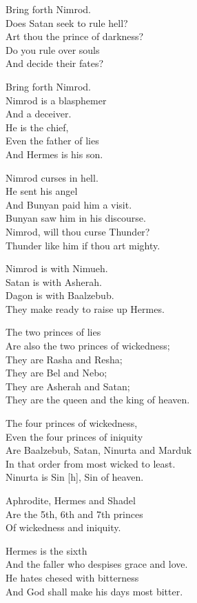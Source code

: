 \documentclass[
]{book}
\begin{document}
Bring forth Nimrod.\\
Does Satan seek to rule hell?\\
Art thou the prince of darkness?\\
Do you rule over souls\\
And decide their fates?

Bring forth Nimrod.\\
Nimrod is a blasphemer\\
And a deceiver.\\
He is the chief,\\
Even the father of lies\\
And Hermes is his son.

Nimrod curses in hell.\\
He sent his angel\\
And Bunyan paid him a visit.\\
Bunyan saw him in his discourse.\\
Nimrod, will thou curse Thunder?\\
Thunder like him if thou art mighty.

Nimrod is with Nimueh.\\
Satan is with Asherah.\\
Dagon is with Baalzebub.\\
They make ready to raise up Hermes.

The two princes of lies\\
Are also the two princes of wickedness;\\
They are Rasha and Resha;\\
They are Bel and Nebo;\\
They are Asherah and Satan;\\
They are the queen and the king of heaven.

The four princes of wickedness,\\
Even the four princes of iniquity\\
Are Baalzebub, Satan, Ninurta and Marduk\\
In that order from most wicked to least.\\
Ninurta is Sin {[}h{]}, Sin of heaven.

Aphrodite, Hermes and Shadel\\
Are the 5th, 6th and 7th princes\\
Of wickedness and iniquity.

Hermes is the sixth\\
And the faller who despises grace and love.\\
He hates chesed with bitterness\\
And God shall make his days most bitter.
\end{document}
